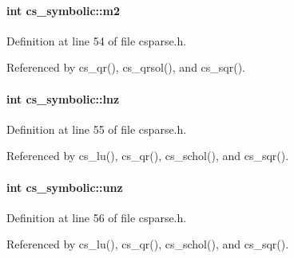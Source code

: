 \hypertarget{structcs__symbolic_a6e76dde6232a98e3b5d96d942c08b12e}{
\paragraph[{m2}]{\setlength{\rightskip}{0pt plus 5cm}int cs\-\_\-symbolic\-::m2}}\label{structcs__symbolic_a6e76dde6232a98e3b5d96d942c08b12e}


Definition at line 54 of file csparse.\-h.



Referenced by cs\-\_\-qr(), cs\-\_\-qrsol(), and cs\-\_\-sqr().

\hypertarget{structcs__symbolic_acfb8969ebae172c2efcc82e1b98ef826}{
\paragraph[{lnz}]{\setlength{\rightskip}{0pt plus 5cm}int cs\-\_\-symbolic\-::lnz}}\label{structcs__symbolic_acfb8969ebae172c2efcc82e1b98ef826}


Definition at line 55 of file csparse.\-h.



Referenced by cs\-\_\-lu(), cs\-\_\-qr(), cs\-\_\-schol(), and cs\-\_\-sqr().

\hypertarget{structcs__symbolic_ad20740ef6e60d2a90e12860c0bf6aab7}{
\paragraph[{unz}]{\setlength{\rightskip}{0pt plus 5cm}int cs\-\_\-symbolic\-::unz}}\label{structcs__symbolic_ad20740ef6e60d2a90e12860c0bf6aab7}


Definition at line 56 of file csparse.\-h.



Referenced by cs\-\_\-lu(), cs\-\_\-qr(), cs\-\_\-schol(), and cs\-\_\-sqr().

